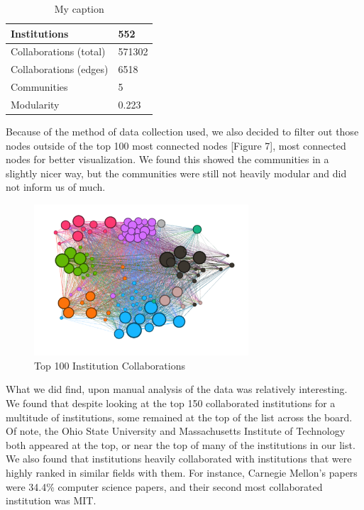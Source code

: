 \documentclass[times, 10pt,twocolumn]{article}
\begin{document}
\begin{table}[h]
\centering
\caption{My caption}
\label{my-label}
\begin{tabular}{|l|l|}
\hline
Institutions           & 552    \\ \hline
Collaborations (total) & 571302 \\ \hline
Collaborations (edges) & 6518   \\ \hline
Communities            & 5      \\ \hline
Modularity             & 0.223  \\ \hline
\end{tabular}
\end{table}

Because of the method of data collection used, we also decided to filter out those nodes outside of the top 100 most connected nodes [Figure 7], most connected nodes for better visualization.  We found this showed the communities in a slightly nicer way, but the communities were still not heavily modular and did not inform us of much.    \\

\begin{figure}[h]
   \includegraphics[width=8cm]{figure7.png}
   \caption{Top 100 Institution Collaborations}
\end{figure}

What we did find, upon manual analysis of the data was relatively interesting. We found that despite looking at the top 150 collaborated institutions for a multitude of institutions, some remained at the top of the list across the board. Of note, the Ohio State University and Massachusetts Institute of Technology both appeared at the top, or near the top of many of the institutions in our list. We also found that institutions heavily collaborated with institutions that were highly ranked in similar fields with them. For instance, Carnegie Mellon’s papers were 34.4\% computer science papers, and their second most collaborated institution was MIT. \\
\end{document}
